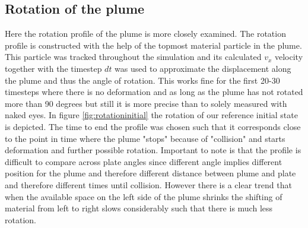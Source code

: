 \documentclass[12pt]{scrreprt}
\begin{document}
\subsection{Rotation of the plume}
Here the rotation profile of the plume is more closely examined. The rotation profile is constructed with the help of the topmost material particle in the plume. This particle was tracked throughout the simulation and its calculated $v_x$ velocity together with the timestep $d t$ was used to approximate the displacement along the plume and thus the angle of rotation. This works fine for the first 20-30 timesteps where there is no deformation and as long as the plume has not rotated more than 90 degrees but still it is more precise than to solely measured with naked eyes. In figure \ref{fig:rotationinitial} the rotation of our reference initial state is depicted. The time to end the profile was chosen such that it corresponds close to the point in time where the plume "stops" because of "collision" and starts deformation and further possible rotation. Important to note is that the profile is difficult to compare across plate angles since different angle implies different position for the plume and therefore different distance between plume and plate and therefore different times until collision. However there is a clear trend that when the available space on the left side of the plume shrinks the shifting of material from left to right slows considerably such that there is much less rotation.
\end{document}
